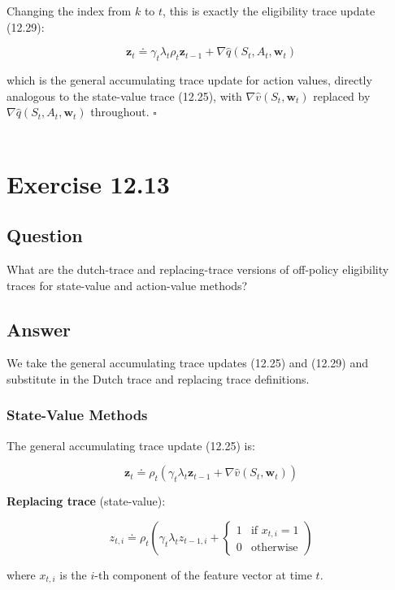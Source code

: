 \documentclass{article}
\begin{document}
Changing the index from $k$ to $t$, this is exactly the eligibility trace update (12.29):

$$\boxed{\mathbf{z}_t \doteq \gamma_t \lambda_t \rho_t \mathbf{z}_{t-1} + 
\nabla\hat{q}(S_t, A_t, \mathbf{w}_t)}$$

which is the general accumulating trace update for action values, directly analogous 
to the state-value trace (12.25), with $\nabla\hat{v}(S_t, \mathbf{w}_t)$ replaced by 
$\nabla\hat{q}(S_t, A_t, \mathbf{w}_t)$ throughout. \hfill$\square$
\\\\
\section*{Exercise 12.13}

\subsection*{Question}

What are the dutch-trace and replacing-trace versions of off-policy eligibility traces 
for state-value and action-value methods?

\subsection*{Answer}

We take the general accumulating trace updates (12.25) and (12.29) and substitute in 
the Dutch trace and replacing trace definitions.

\subsubsection*{State-Value Methods}

The general accumulating trace update (12.25) is:

$$\mathbf{z}_t \doteq \rho_t(\gamma_t\lambda_t\mathbf{z}_{t-1} + \nabla\hat{v}(S_t, \mathbf{w}_t))$$

\textbf{Replacing trace} (state-value):

$$z_{t,i} \doteq \rho_t\left(\gamma_t\lambda_t z_{t-1,i} + \begin{cases} 1 & \text{if } x_{t,i} = 1 \\ 0 & \text{otherwise}\end{cases}\right)$$

where $x_{t,i}$ is the $i$-th component of the feature vector at time $t$.
\end{document}
